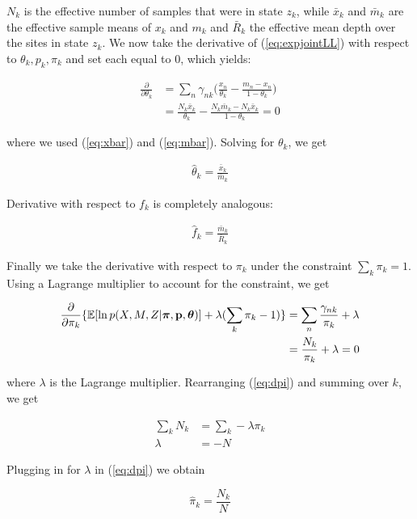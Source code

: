 \documentclass[a4paper]{article}
\newcommand{\vp}{{\bf p}}
\newcommand{\vpi}{{\bm \pi}}
\newcommand{\vtheta}{{\bm \theta}}
\newcommand{\E}{\mathbb{E}}
\begin{document}
$N_k$ is the effective number of samples that were in state $z_k$, while $\bar{x}_k$ and $\bar{m}_k$ are the effective sample means of $x_k$ and $m_k$ and $\bar{R}_k$ the effective mean depth over the sites in state $z_k$. We now take the derivative of (\ref{eq:expjointLL}) with respect to $\theta_k, p_k, \pi_k$ and set each equal to 0, which yields:

\begin{align}
\frac{\partial}{\partial \theta_k} &= \sum_n \gamma_{nk} \Big( \frac{ x_n}{\theta_k} - \frac{m_n - x_n}{1- \theta_k} \Big)\\
					      &= \frac{N_k \bar{x}_k}{\theta_k} - \frac{N_k \bar{m}_k - N_k \bar{x}_k}{1- \theta_k} = 0
\end{align}

where we used (\ref{eq:xbar}) and (\ref{eq:mbar}). Solving for $\theta_k$, we get

\begin{align}
\hat{\theta}_k = \frac{\bar{x}_k}{\bar{m}_k} \label{eq:theta}
\end{align}

Derivative with respect to $f_k$ is completely analogous:

\begin{align}
\hat{f}_k = \frac{\bar{m}_k}{\bar{R}_k} \label{eq:f}
\end{align}

Finally we take the derivative with respect to $\pi_k$ under the constraint $\sum_k \pi_k = 1$. Using a Lagrange multiplier to account for the constraint, we get

\begin{align}
\frac{\partial}{\partial \pi_k} \{ \E [ \ln p(X, M , Z | \vpi, \vp, \vtheta) ] + \lambda ( \sum_k \pi_k - 1)\} &= \sum_n \frac{\gamma_{nk}}{\pi_k} + \lambda \nonumber \\
																   &= \frac{N_k}{\pi_k} + \lambda = 0 \label{eq:dpi}
\end{align}

where $\lambda$ is the Lagrange multiplier. Rearranging (\ref{eq:dpi}) and summing over $k$, we get

\begin{align*}
\sum_k N_k &= \sum_k - \lambda \pi_k \\
      \lambda &= - N 
\end{align*}

Plugging in for $\lambda$ in (\ref{eq:dpi}) we obtain

\begin{equation}
\hat{\pi}_k = \frac{N_k}{N}
\end{equation}
\end{document}
